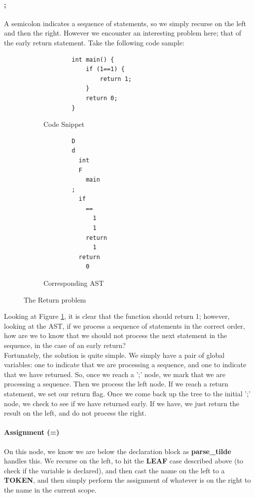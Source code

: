 \documentclass[12pt]{article}
\begin{document}
 \paragraph{;} A semicolon indicates a sequence of statements, so we simply recurse on the left and then the right. However we encounter an interesting problem here; that of the early return statement. Take the following code sample:
 \begin{figure}[H]
    \centering
    \begin{subfigure}{.5\textwidth}
      \centering
      \begin{verbatim}
        int main() {
            if (1==1) {
                return 1;
            } 
            return 0;
        }
      \end{verbatim}
      \caption{Code Snippet}
      \label{code}
    \end{subfigure}%
    \begin{subfigure}{.5\textwidth}
      \centering
      \begin{verbatim}
        D
        d
          int
          F
            main
        ;
          if
            ==
              1
              1
            return
              1
          return
            0
      \end{verbatim}
      \caption{Corresponding AST}
      \label{ast}
    \end{subfigure}
    \caption{The Return problem}
    \label{rp}
    \end{figure}
Looking at Figure \ref{code}, it is clear that the function should return 1; however, looking at the AST, if we process a sequence of statements in the correct order, how are we to know that we should not process the next statement in the sequence, in the case of an early return? \\\newline
Fortunately, the solution is quite simple. We simply have a pair of global variables: one to indicate that we are processing a sequence, and one to indicate that we have returned. So, once we reach a ';' node, we mark that we are processing a sequence. Then we process the left node. If we reach a return statement, we set our return flag. Once we come back up the tree to the initial ';' node, we check to see if we have returned early. If we have, we just return the result on the left, and do not process the right.
\paragraph{Assignment (=)} On this node, we know we are below the declaration block as \textbf{parse\_tilde} handles this. We recurse on the left, to hit the \textbf{LEAF} case described above (to check if the variable is declared), and then cast the name on the left to a \textbf{TOKEN}, and then simply perform the assignment of whatever is on the right to the name in the current scope. 
\end{document}
